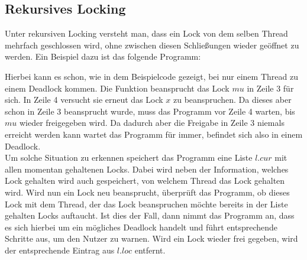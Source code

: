 \subsection{Rekursives Locking}
Unter rekursiven Locking versteht man, dass ein Lock von dem selben Thread 
mehrfach geschlossen wird, ohne zwischen diesen Schließungen wieder geöffnet zu
werden. Ein Beispiel dazu ist das folgende Programm:
\begin{figure}[H]
    
\end{figure}
Hierbei kann es schon, wie in dem Beispielcode gezeigt, bei nur einem Thread
zu einem Deadlock kommen. Die Funktion beansprucht das Lock $mu$ in Zeile $3$ 
für sich. In Zeile 4 versucht sie erneut das Lock $x$ zu beanspruchen. Da dieses
aber schon in Zeile 3 beansprucht wurde, muss das Programm vor Zeile 4 warten, 
bis $mu$ wieder freigegeben wird. Da dadurch aber die Freigabe in Zeile 3 
niemals erreicht werden kann wartet das Programm für immer, befindet sich also 
in einem Deadlock.\\
Um solche Situation zu erkennen speichert das Programm eine Liste $l.cur$ mit 
allen momentan gehaltenen 
Locks. Dabei wird neben der Information, welches Lock gehalten wird auch 
gespeichert, von welchem Thread das Lock gehalten wird. Wird nun ein Lock neu 
beansprucht, überprüft 
das Programm, ob dieses Lock mit dem Thread, der das Lock beanspruchen möchte 
bereits in der Liste gehalten Locks auftaucht. Ist dies der Fall, dann nimmt das
Programm an, dass es sich hierbei um ein mögliches Deadlock handelt und führt 
entsprechende Schritte aus, um den Nutzer zu warnen. Wird ein Lock wieder frei
gegeben, wird der entsprechende Eintrag aus $l.loc$ entfernt.

